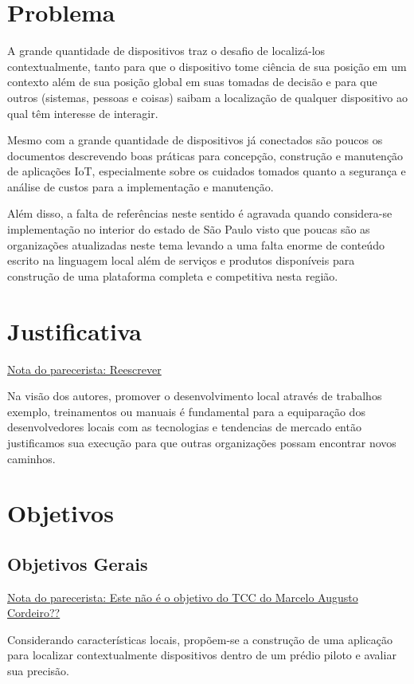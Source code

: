 \documentclass[
	12pt,				%
	openright,			%
	oneside,			%
	a4paper,			%
	chapter=TITLE,		%
	english,			%
	french,				%
	spanish,			%
	brazil				%
	]{abntex2}
\begin{document}
{\chapter{Problema}

A grande quantidade de dispositivos traz o desafio de localizá-los
contextualmente, tanto para que o dispositivo tome ciência de sua posição em um
contexto além de sua posição global em suas tomadas de decisão e para que outros
(sistemas, pessoas e coisas) saibam a localização de qualquer dispositivo ao
qual têm interesse de interagir.

Mesmo com a grande quantidade de dispositivos já conectados são poucos os
documentos descrevendo boas práticas para concepção, construção e manutenção de
aplicações IoT, especialmente sobre os cuidados tomados quanto a segurança e
análise de custos para a implementação e manutenção.

Além disso, a falta de referências neste sentido é agravada quando considera-se
implementação no interior do estado de São Paulo visto que poucas são as
organizações atualizadas neste tema levando a uma falta enorme de conteúdo
escrito na linguagem local além de serviços e produtos disponíveis para
construção de uma plataforma completa e competitiva nesta região.

\chapter{Justificativa}

\underline{Nota do parecerista: Reescrever}

Na visão dos autores, promover o desenvolvimento local através de trabalhos
exemplo, treinamentos ou manuais é fundamental para a equiparação dos
desenvolvedores locais com as tecnologias e tendencias de mercado então
justificamos sua execução para que outras organizações possam encontrar novos
caminhos.

\chapter{Objetivos}

\section{Objetivos Gerais}

\underline{Nota do parecerista: Este não é o objetivo do TCC do Marcelo Augusto Cordeiro??}

Considerando características locais, propõem-se a construção de uma aplicação
para localizar contextualmente dispositivos dentro de um prédio piloto e avaliar
sua precisão.

}
\end{document}
